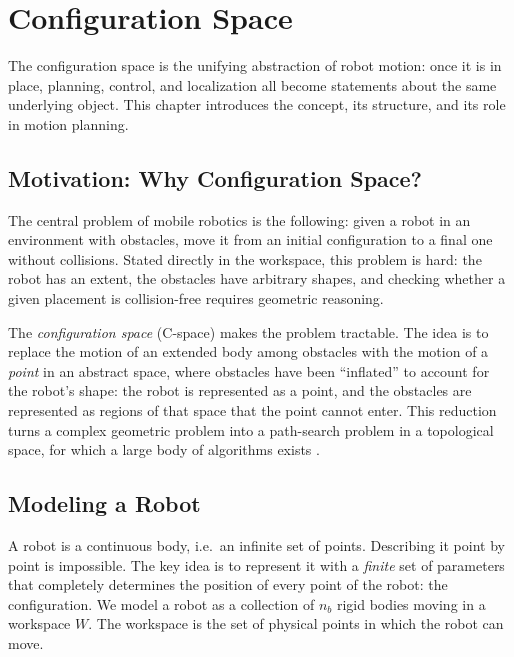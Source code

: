 \chapter{Configuration Space}
\label{ch:configuration-space}

The configuration space is the unifying abstraction of robot motion:
once it is in place, planning, control, and localization all become
statements about the same underlying object. This chapter introduces
the concept, its structure, and its role in motion planning.

\section{Motivation: Why Configuration Space?}
\label{sec:why-cspace}

The central problem of mobile robotics is the following: given a robot
in an environment with obstacles, move it from an initial configuration
to a final one without collisions. Stated directly in the workspace,
this problem is hard: the robot has an extent, the obstacles have
arbitrary shapes, and checking whether a given placement is collision-free
requires geometric reasoning.

The \emph{configuration space} (C-space) makes the problem tractable.
The idea is to replace the motion of an extended body among obstacles with the motion of a
\emph{point} in an abstract space, where obstacles have been ``inflated''
to account for the robot's shape: the robot is represented as a point,
and the obstacles are represented as regions of that space that the
point cannot enter.
This reduction turns a complex geometric problem into a path-search problem in a topological space,
for which a large body of algorithms exists
\cite{choset2005principles, siciliano2025foundations}.

\section{Modeling a Robot}
\label{sec:modeling-robot}

A robot is a continuous body, i.e.\ an infinite set of points.
Describing it point by point is impossible. The key idea is to
represent it with a \emph{finite} set of parameters that completely
determines the position of every point of the robot: the
configuration. We model a robot as a collection of \( n_b \) rigid
bodies moving in a workspace \( W \). The workspace is the set of
physical points in which the robot can move.

